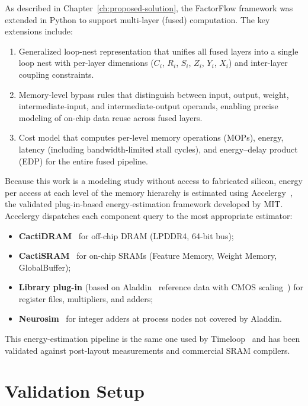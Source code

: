 As described in Chapter~\ref{ch:proposed-solution}, the FactorFlow
framework was extended in Python to support multi-layer (fused)
computation.
The key extensions include:
\begin{enumerate}
  \item Generalized loop-nest representation that unifies all fused
        layers into a single loop nest with per-layer dimensions
        ($C_i$, $R_i$, $S_i$, $Z_i$, $Y_i$, $X_i$) and inter-layer
        coupling constraints.
  \item Memory-level bypass rules that distinguish between input, output,
        weight, intermediate-input, and intermediate-output operands,
        enabling precise modeling of on-chip data reuse across fused
        layers.
  \item Cost model that computes per-level memory operations (MOPs),
        energy, latency (including bandwidth-limited stall cycles), and
        energy--delay product (EDP) for the entire fused pipeline.
\end{enumerate}

Because this work is a modeling study without access to fabricated
silicon, energy per access at each level of the memory hierarchy is
estimated using Accelergy~\cite{accelergy}, the validated plug-in-based
energy-estimation framework developed by MIT.
Accelergy dispatches each component query to the most appropriate
estimator:
\begin{itemize}
  \item \textbf{CactiDRAM}~\cite{cacti} for off-chip DRAM (LPDDR4,
        64-bit bus);
  \item \textbf{CactiSRAM}~\cite{cacti} for on-chip SRAMs (Feature
        Memory, Weight Memory, GlobalBuffer);
  \item \textbf{Library plug-in} (based on Aladdin~\cite{aladdin}
        reference data with CMOS scaling~\cite{stillmaker2017scaling})
        for register files, multipliers, and adders;
  \item \textbf{Neurosim}~\cite{neurosim} for integer adders at
        process nodes not covered by Aladdin.
\end{itemize}
This energy-estimation pipeline is the same one used by
Timeloop~\cite{timeloop} and has been validated against post-layout
measurements and commercial SRAM compilers.


\section{Validation Setup}
\label{sec:val-setup}


